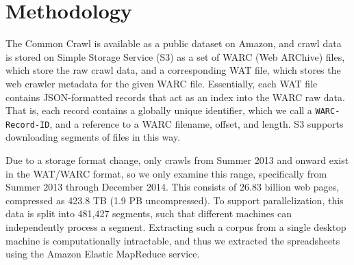 \documentclass[conference]{IEEEtran}
\begin{document}

\section{Methodology}



The Common Crawl is available as a public dataset on Amazon, and crawl data is stored on Simple Storage Service (S3) as a set of WARC (Web ARChive) files, which store the raw crawl data, and a corresponding WAT file, which stores the web crawler metadata for the given WARC file. Essentially, each WAT file contains JSON-formatted records that act as an index into the WARC raw data. That is, each record contains a globally unique identifier, which we call a \texttt{WARC-Record-ID}, and a reference to a WARC filename, offset, and length. S3 supports downloading segments of files in this way.

Due to a storage format change, only crawls from Summer 2013 and onward exist in the WAT/WARC format, so we only examine this range, specifically from Summer 2013 through December 2014.  This consists of 26.83 billion web pages, compressed as 423.8 TB (1.9 PB uncompressed). To support parallelization, this data is split into 481,427 segments, such that different machines can independently process a segment. Extracting such a corpus from a single desktop machine is computationally intractable, and thus we extracted the spreadsheets using the Amazon Elastic MapReduce service.

\end{document}
